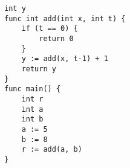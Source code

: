 \begin{lstlisting}[caption={A small recursive program}, label={ex02}]
int y
func int add(int x, int t) {
	if (t == 0) {
	    return 0
	}
	y := add(x, t-1) + 1
	return y
}
func main() {
	int r
	int a
	int b
	a := 5
	b := 8
	r := add(a, b)
}
\end{lstlisting}